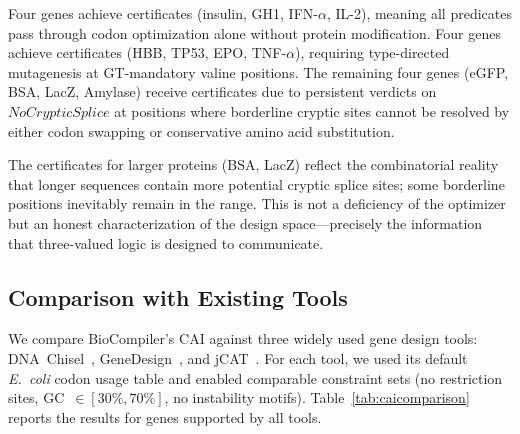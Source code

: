 Four genes achieve \GOLD{} certificates (insulin, GH1, IFN-$\alpha$,
IL-2), meaning all predicates pass through codon optimization alone
without protein modification.  Four genes achieve \SILVER{} certificates
(HBB, TP53, EPO, TNF-$\alpha$), requiring type-directed mutagenesis at
GT-mandatory valine positions.  The remaining four genes (eGFP, BSA,
LacZ, Amylase) receive \BRONZE{} certificates due to persistent
\UNCERTAIN{} verdicts on $\mathit{NoCrypticSplice}$ at positions where
borderline cryptic sites cannot be resolved by either codon swapping or
conservative amino acid substitution.

The \BRONZE{} certificates for larger proteins (BSA, LacZ) reflect the
combinatorial reality that longer sequences contain more potential
cryptic splice sites; some borderline positions inevitably remain in the
\UNCERTAIN{} range.  This is not a deficiency of the optimizer but an
honest characterization of the design space---precisely the information
that three-valued logic is designed to communicate.

\subsection{Comparison with Existing Tools}\label{sec:comparison}

We compare BioCompiler's CAI against three widely used gene design tools:
DNA~Chisel~\cite{piret2020dnachisel},
GeneDesign~\cite{richardson2006genedesign}, and
jCAT~\cite{gage2006jcat}.  For each tool, we used its default
\emph{E.~coli} codon usage table and enabled comparable constraint sets
(no restriction sites, GC~$\in [30\%, 70\%]$, no instability motifs).
Table~\ref{tab:caicomparison} reports the results for genes supported by
all tools.

